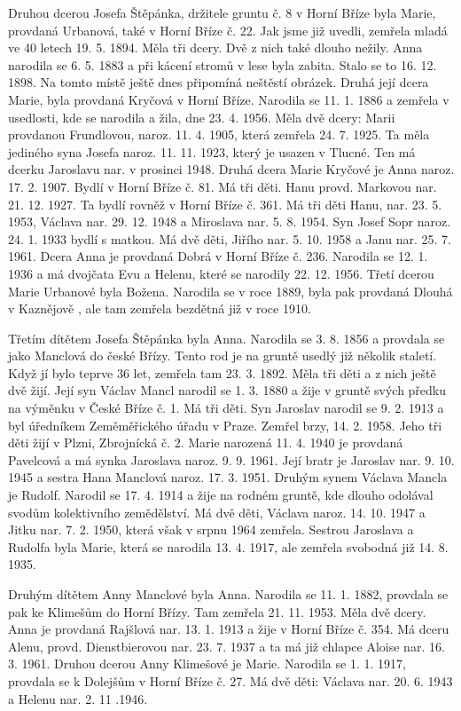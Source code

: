 \documentclass[../dejiny-rodu-prusiku.tex]{subfiles}
\begin{document}
Druhou dcerou Josefa Štěpánka, držitele gruntu č. 8 v Horní Bříze byla Marie, provdaná Urbanová, také v Horní Bříze č. 22. Jak jsme již uvedli, zemřela mladá ve 40 letech 19. 5. 1894. Měla tři dcery. Dvě z nich také dlouho nežily. Anna narodila se 6. 5. 1883 a při kácení stromů v lese byla zabita. Stalo se to 16. 12. 1898. Na tomto místě ještě dnes připomíná neštěstí obrázek. Druhá její dcera Marie, byla provdaná Kryčová v Horní Bříze. Narodila se 11. 1. 1886 a zemřela v usedlosti, kde se narodila a žila, dne 23. 4. 1956. Měla dvě dcery: Marii provdanou Frundlovou, naroz. 11. 4. 1905, která zemřela 24. 7. 1925. Ta měla jediného syna Josefa naroz. 11. 11. 1923, který je usazen v Tlucné. Ten má dcerku Jaroslavu nar. v prosinci 1948. Druhá dcera Marie Kryčové je Anna naroz. 17. 2. 1907. Bydlí v Horní Bříze č. 81. Má tři děti. Hanu provd. Markovou nar. 21. 12. 1927. Ta bydlí rovněž v Horní Bříze č. 361. Má tři děti Hanu, nar. 23. 5. 1953, Václava nar. 29. 12. 1948 a Miroslava nar. 5. 8. 1954. Syn Josef Sopr naroz. 24. 1. 1933 bydlí s matkou. Má dvě děti, Jiřího nar. 5. 10. 1958 a Janu nar. 25. 7. 1961. Dcera Anna je provdaná Dobrá v Horní Bříze č. 236. Narodila se 12. 1. 1936 a má dvojčata Evu a Helenu, které se narodily 22. 12. 1956. Třetí dcerou Marie Urbanové byla Božena. Narodila se v roce 1889, byla pak provdaná Dlouhá v Kaznějově , ale tam zemřela bezdětná již v roce 1910.

Třetím dítětem Josefa Štěpánka byla Anna. Narodila se 3. 8. 1856 a provdala se jako Manclová do české Břízy. Tento rod je na gruntě usedlý již několik staletí. Když jí bylo teprve 36 let, zemřela tam 23. 3. 1892. Měla tři děti a z nich ještě dvě žijí. Její syn Václav Mancl na­rodil se 1. 3. 1880 a žije v gruntě svých předku na vý­měnku v České Bříze č. 1. Má tři děti. Syn Jaroslav na­rodil se 9. 2. 1913 a byl úředníkem Zeměměřického úřadu v Praze. Zemřel brzy, 14. 2. 1958. Jeho tři děti žijí v Plzni, Zbrojnícká č. 2. Marie narozená 11. 4. 1940 je provda­ná Pavelcová a má synka Jaroslava naroz. 9. 9. 1961. Její bratr je Jaroslav nar. 9. 10. 1945 a sestra Hana Manclová naroz. 17. 3. 1951. Druhým synem Václava Mancla je Rudolf. Narodil se 17. 4. 1914 a žije na rodném gruntě, kde dlou­ho odolával svodům kolektivního zemědělství. Má dvě děti, Václava naroz. 14. 10. 1947 a Jitku nar. 7. 2. 1950, která však v srpnu 1964 zemřela. Sestrou Jaroslava a Rudolfa byla Marie, která se narodila 13. 4. 1917, ale zemřela svobodná již 14. 8. 1935.

Druhým dítětem Anny Manclové byla Anna. Narodila se 11. 1. 1882, provdala se pak ke Klimešům do Horní Břízy. Tam zemřela 21. 11. 1953. Měla dvě dcery. Anna je provdaná Rajšlová nar. 13. 1. 1913 a žije v Horní Bříze č. 354. Má dce­ru Alenu, provd. Dienstbierovou nar. 23. 7. 1937 a ta má již chlapce Aloise nar. 16. 3. 1961. Druhou dcerou Anny Klime­šové je Marie. Narodila se 1. 1. 1917, provdala se k Do­lejšům v Horní Bříze č. 27. Má dvě děti: Václava nar. 20. 6. 1943 a Helenu nar. 2. 11 .1946.
\end{document}
